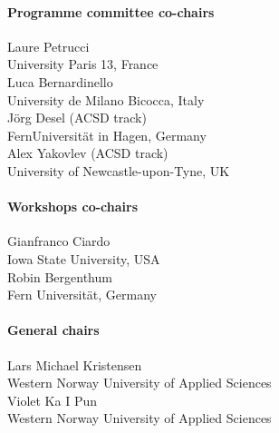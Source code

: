\documentclass[10pt,a4paper]{article}
\newcommand{\styleUniv}[1]{\textcolor{black!75}{#1}}
\begin{document}
\setlength{\columnsep}{-5cm}
\begin{multicols}{2}
\paragraph*{Programme committee co-chairs}\mbox{}

\noindent Laure Petrucci \\
\indent \styleUniv{University Paris 13, France} \\
\noindent Luca Bernardinello \\
\indent \styleUniv{University de Milano Bicocca, Italy} \\
\noindent Jörg Desel (ACSD track) \\
\indent \styleUniv{FernUniversität in Hagen, Germany} \\
\noindent Alex Yakovlev (ACSD track) \\
\indent \styleUniv{University of Newcastle-upon-Tyne, UK}

\paragraph*{Workshops co-chairs}\mbox{}

\noindent Gianfranco Ciardo \\
\indent \styleUniv{Iowa State University, USA} \\
\noindent Robin Bergenthum \\
\indent \styleUniv{Fern Universität, Germany}

\vspace*{-8.5em}
\paragraph*{General chairs}\mbox{}

\noindent Lars Michael Kristensen \\
\indent \styleUniv{Western Norway University of Applied Sciences}\\
\noindent Violet Ka I Pun \\
\indent \styleUniv{Western Norway University of Applied Sciences}


\end{multicols}
\end{document}
